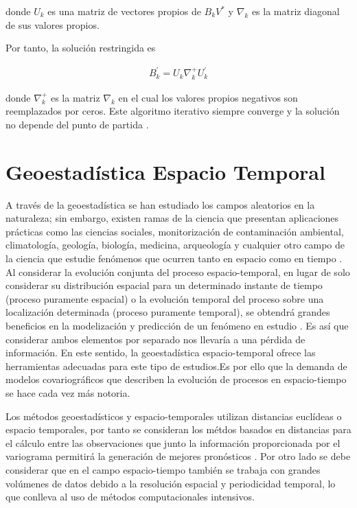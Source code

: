 \documentclass[
]{book}
\begin{document}
donde \(U_k\) es una matriz de vectores propios de \(B_kV^{*}\) y \(\nabla_k\) es la matriz diagonal de sus valores propios.

Por tanto, la solución restringida es

\begin{align}
    B_k^{'}=U_k\nabla_k^{+}U_k^{'}
\end{align}

donde \(\nabla_k^{+}\) es la matriz \(\nabla_k\) en el cual los valores propios negativos son reemplazados por ceros. Este algoritmo iterativo siempre converge y la solución no depende del punto de partida \citep{peter}.

\hypertarget{geoestaduxedstica-espacio-temporal}{%
\section{Geoestadística Espacio Temporal}\label{geoestaduxedstica-espacio-temporal}}

A través de la geoestadística se han estudiado los campos aleatorios en la naturaleza; sin embargo, existen ramas de la ciencia que presentan aplicaciones prácticas como las ciencias sociales, monitorización de contaminación ambiental, climatología, geología, biología, medicina, arqueología y cualquier otro campo de la ciencia que estudie fenómenos que ocurren tanto en espacio como en tiempo \citep{montero}. Al considerar la evolución conjunta del proceso espacio-temporal, en lugar de solo considerar su distribución espacial para un determinado instante de tiempo (proceso puramente espacial) o la evolución temporal del proceso sobre una localización determinada (proceso puramente temporal), se obtendrá grandes beneficios en la modelización y predicción de un fenómeno en estudio \citep{gstcasal}. Es así que considerar ambos elementos por separado nos llevaría a una pérdida de información. En este sentido, la geoestadística espacio-temporal ofrece las herramientas adecuadas para este tipo de estudios.Es por ello que la demanda de modelos covariográficos que describen la evolución de procesos en espacio-tiempo se hace cada vez más notoria.

Los métodos geoestadísticos y espacio-temporales utilizan distancias euclídeas o espacio temporales, por tanto se consideran los métdos basados en distancias para el cálculo entre las observaciones que junto la información proporcionada por el variograma permitirá la generación de mejores pronósticos \citep{gstcasal}. Por otro lado se debe considerar que en el campo espacio-tiempo también se trabaja con grandes volúmenes de datos debido a la resolución espacial y periodicidad temporal, lo que conlleva al uso de métodos computacionales intensivos.
\end{document}
